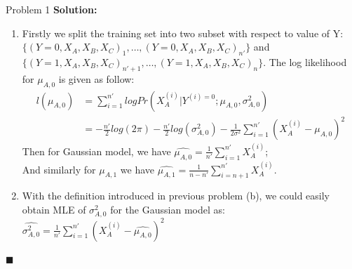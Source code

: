 \documentclass{article}
\newenvironment{solution}                               %
{\textbf{Solution:} }{$\blacksquare$}                   %
\begin{document}
\begin{section}{Problem 1}
\begin{solution}
\begin{enumerate}[label=(\alph*)]
                \item Firstly we split the training set into two subset with respect to value of Y: $\{(Y=0, X_A, X_B, X_C)_{1}, \dots, (Y=0, X_A, X_B, X_C)_{n'}\}$ and $\{(Y=1, X_A, X_B, X_C)_{n'+1}, \dots, (Y=1, X_A, X_B, X_C)_{n}\}$.
                The log likelihood for $\mu_{A,0}$ is given as follow:
                \begin{align*}
                    l(\mu_{A,0}) &= \sum_{i=1}^{n'} log Pr(X_A^{(i)} | Y^{(i)=0}; \mu_{A,0}, \sigma^2_{A,0})
                    \\
                    &= -\frac{n'}{2} log(2\pi) - \frac{n'}{2} log(\sigma^2_{A,0}) - \frac{1}{2 \sigma^2} \sum_{i=1}^{n'} (X_A^{(i)} - \mu_{A,0})^2
                \end{align*}
                Then for Gaussian model, we have $\hat{\mu_{A,0}} = \frac{1}{n'} \sum_{i=1}^{n'} X_A^{(i)}$;\\
                And similarly for $\mu_{A,1}$ we have $\hat{\mu_{A,1}} = \frac{1}{n - n'} \sum_{i=n+1}^{n'} X_A^{(i)}$.

                \item With the definition introduced in previous problem (b), we could easily obtain MLE of $\sigma^2_{A,0}$ for the Gaussian model as: $\hat{\sigma^2_{A,0}} = \frac{1}{n'} \sum_{i=1}^{n'} (X_A^{(i)} - \hat{\mu_{A,0}})^2$
                
            \end{enumerate}
        \end{solution}
    \end{section}
    
\end{document}
